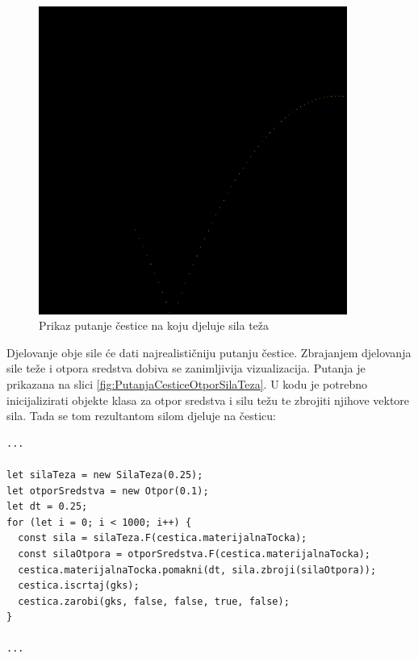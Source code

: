 \documentclass{foi}
\begin{document}
\begin{figure}[H]
    \centering
    \includegraphics[width=0.9\textwidth]{slike/12_PutanjaCesticeSilaTeza.png}
    \captionsetup{justification=centering}
    \caption{Prikaz putanje čestice na koju djeluje sila teža}
\label{fig:PutanjaCesticeSilaTeza}
\end{figure}
Djelovanje obje sile će dati najrealističniju putanju čestice. Zbrajanjem djelovanja sile teže i otpora sredstva dobiva se zanimljivija vizualizacija. Putanja je prikazana na slici \ref{fig:PutanjaCesticeOtporSilaTeza}. U kodu je potrebno inicijalizirati objekte klasa za otpor sredstva i silu težu te zbrojiti njihove vektore sila. Tada se tom rezultantom silom djeluje na česticu:

\begin{verbatim}
...

let silaTeza = new SilaTeza(0.25);
let otporSredstva = new Otpor(0.1);
let dt = 0.25;
for (let i = 0; i < 1000; i++) {
  const sila = silaTeza.F(cestica.materijalnaTocka);
  const silaOtpora = otporSredstva.F(cestica.materijalnaTocka);
  cestica.materijalnaTocka.pomakni(dt, sila.zbroji(silaOtpora));
  cestica.iscrtaj(gks);
  cestica.zarobi(gks, false, false, true, false);
}

...
\end{verbatim}
\end{document}
